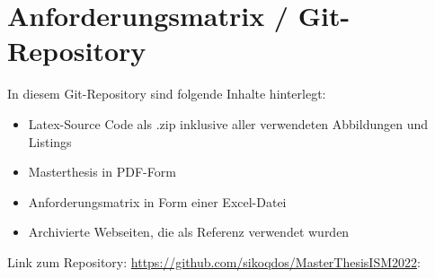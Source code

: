 \chapter{Anforderungsmatrix / Git-Repository}
In diesem Git-Repository sind folgende Inhalte hinterlegt:

\begin{itemize}
    \item Latex-Source Code als .zip inklusive aller verwendeten Abbildungen und Listings
    \item Masterthesis in PDF-Form
    \item Anforderungsmatrix in Form einer Excel-Datei
    \item Archivierte Webseiten, die als Referenz verwendet wurden
\end{itemize}
\bigbreak
Link zum Repository: {\url{https://github.com/sikoqdos/MasterThesisISM2022}}: